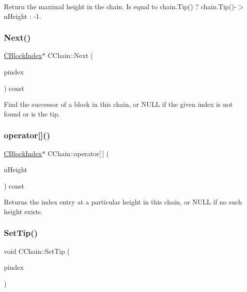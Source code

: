 Return the maximal height in the chain. Is equal to chain.\+Tip() ? chain.\+Tip()-\/$>$n\+Height \+: -\/1. \mbox{\label{class_c_chain_a3077e83c87e8a974765fa76a57fd040b}} 
\subsubsection{\texorpdfstring{Next()}{Next()}}
{\footnotesize\ttfamily \mbox{\hyperlink{class_c_block_index}{C\+Block\+Index}}$\ast$ C\+Chain\+::\+Next (\begin{DoxyParamCaption}\item[{const \mbox{\hyperlink{class_c_block_index}{C\+Block\+Index}} $\ast$}]{pindex }\end{DoxyParamCaption}) const\hspace{0.3cm}{\ttfamily [inline]}}

Find the successor of a block in this chain, or N\+U\+LL if the given index is not found or is the tip. \mbox{\label{class_c_chain_a13c4493c833ffb8d1725fde05e42b28a}} 
\subsubsection{\texorpdfstring{operator[]()}{operator[]()}}
{\footnotesize\ttfamily \mbox{\hyperlink{class_c_block_index}{C\+Block\+Index}}$\ast$ C\+Chain\+::operator\mbox{[}$\,$\mbox{]} (\begin{DoxyParamCaption}\item[{int}]{n\+Height }\end{DoxyParamCaption}) const\hspace{0.3cm}{\ttfamily [inline]}}

Returns the index entry at a particular height in this chain, or N\+U\+LL if no such height exists. \mbox{\label{class_c_chain_aeb563751f7362d4308c7c2cb35b834a5}} 
\subsubsection{\texorpdfstring{SetTip()}{SetTip()}}
{\footnotesize\ttfamily void C\+Chain\+::\+Set\+Tip (\begin{DoxyParamCaption}\item[{\mbox{\hyperlink{class_c_block_index}{C\+Block\+Index}} $\ast$}]{pindex }\end{DoxyParamCaption})}

